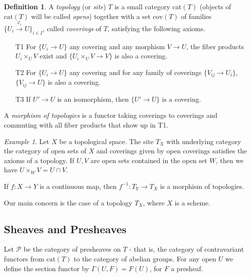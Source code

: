 \documentclass[letterpaper,11pt]{article}
\theoremstyle{definition}
\newtheorem{defn}{Definition}
\theoremstyle{remark}
\newtheorem{ex}{Example}
\begin{document}
\begin{defn} A \emph{topology} (or \emph{site}) $T$ is a small category $\mbox{cat}(T)$ (objects of $\mbox{cat}(T)$ will be called \emph{opens}) together with a set $\mbox{cov}(T)$ of families $\{U_i \stackrel{\varphi_i}{\rightarrow} U\}_{i\in I}$, called \emph{coverings} of $T$, satisfying the following axioms.
\begin{itemize}
\item[T1] For $\{U_i \rightarrow U\}$ any covering and any morphism $V\rightarrow U$, the fiber products $U_i \times_U V$ exist and $\{U_i \times_U V \rightarrow V\}$ is also a covering.

\item[T2] For $\{U_i \rightarrow U\}$ any covering and for any family of coverings $\{V_{ij} \rightarrow U_i\}$, $\{V_{ij} \rightarrow U\}$ is also a covering.

\item[T3] If $U' \rightarrow U$ is an isomorphism, then $\{U' \rightarrow U\}$ is a covering.
\end{itemize}

A \emph{morphism of topologies} is a functor taking coverings to coverings and commuting with all fiber products that show up in T1.
\end{defn}

\begin{ex} Let $X$ be a topological space. The site $T_X$ with underlying category the category of open sets of $X$ and coverings given by open coverings satisfies the axioms of a topology. If $U,V$ are open sets contained in the open set $W$, then we have $U\times_W V = U\cap V$.

If $f:X\rightarrow Y$ is a continuous map, then $f^{-1} : T_Y \rightarrow T_X$ is a morphism of topologies.
\end{ex}

Our main concern is the case of a topology $T_X$, where $X$ is a scheme.

\subsection{Sheaves and Presheaves}

Let $\mathcal{P}$ be the category of presheaves on $T$ - that is, the category of contravariant functors from $\mbox{cat}(T)$ to the category of abelian groups. For any open $U$ we define the section functor by $\Gamma(U,F) = F(U)$, for $F$ a presheaf.
\end{document}
